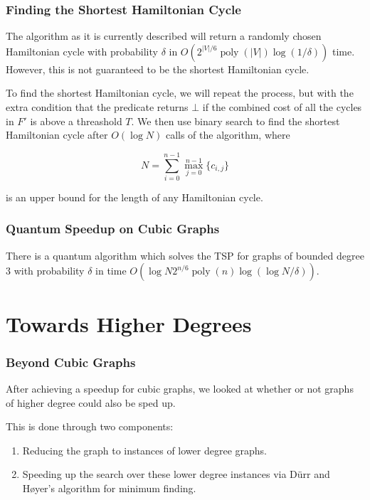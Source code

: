 \documentclass[]{beamer}
\DeclareMathOperator{\poly}{poly}
\begin{document}
\begin{frame}
\frametitle{Finding the Shortest Hamiltonian Cycle}

The algorithm as it is currently described will return a randomly chosen Hamiltonian cycle with probability $\delta$ in $O(2^{|V|/6}\poly(|V|)\log(1/\delta))$ time. However, this is not guaranteed to be the shortest Hamiltonian cycle.

To find the shortest Hamiltonian cycle, we will repeat the process, but with the extra condition that the predicate returns $\bot$ if the combined cost of all the cycles in $F'$ is above a threashold $T$. We then use binary search to find the shortest Hamiltonian cycle after $O(\log N)$ calls of the algorithm, where

$$N = \sum_{i = 0}^{n-1}\max_{j = 0}^{n-1}\{c_{i,j}\}$$

is an upper bound for the length of any Hamiltonian cycle.
\end{frame}

\begin{frame}
\frametitle{Quantum Speedup on Cubic Graphs}
\begin{theorem}
There is a quantum algorithm which solves the TSP for graphs of bounded degree $3$ with probability $\delta$ in time $O(\log N2^{n/6}\poly(n)\log(\log N/\delta))$.
\end{theorem}
\end{frame}

\section{Towards Higher Degrees}

\begin{frame}
\frametitle{Beyond Cubic Graphs}
After achieving a speedup for cubic graphs, we looked at whether or not graphs of higher degree could also be sped up.

This is done through two components:
\begin{enumerate}
\item Reducing the graph to instances of lower degree graphs.
\item Speeding up the search over these lower degree instances via D\"urr and H\o yer's algorithm for minimum finding.
\end{enumerate}
\end{frame}
\end{document}
